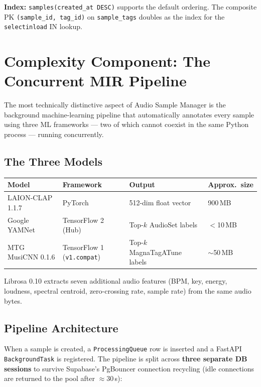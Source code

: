 \documentclass[12pt,letterpaper]{report}
\begin{document}
\textbf{Index:} \texttt{samples(created\_at DESC)} supports the default ordering. The composite PK \texttt{(sample\_id, tag\_id)} on \texttt{sample\_tags} doubles as the index for the \texttt{selectinload} IN lookup.

\chapter{Complexity Component: The Concurrent MIR Pipeline}

The most technically distinctive aspect of Audio Sample Manager is the background machine-learning pipeline that automatically annotates every sample using three ML frameworks --- two of which cannot coexist in the same Python process --- running concurrently.

\section{The Three Models}

\begin{center}
\begin{tabular}{llll}
\toprule
\textbf{Model} & \textbf{Framework} & \textbf{Output} & \textbf{Approx.\ size} \\
\midrule
LAION-CLAP 1.1.7   & PyTorch  & 512-dim float vector & 900\,MB \\
Google YAMNet      & TensorFlow 2 (Hub) & Top-$k$ AudioSet labels & $<$10\,MB \\
MTG MusiCNN 0.1.6  & TensorFlow 1 (\texttt{v1.compat}) & Top-$k$ MagnaTagATune labels & $\sim$50\,MB \\
\bottomrule
\end{tabular}
\end{center}

Librosa 0.10 extracts seven additional audio features (BPM, key, energy, loudness, spectral centroid, zero-crossing rate, sample rate) from the same audio bytes.

\section{Pipeline Architecture}

When a sample is created, a \texttt{ProcessingQueue} row is inserted and a FastAPI \texttt{BackgroundTask} is registered. The pipeline is split across \textbf{three separate DB sessions} to survive Supabase's PgBouncer connection recycling (idle connections are returned to the pool after $\approx$30\,s):
\end{document}
